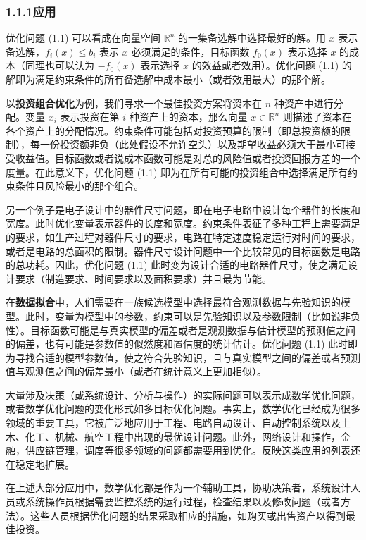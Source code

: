 \documentclass[UTF8, 12pt, fontset=fandol, oneside]{ctexart}
\begin{document}
\subsubsection*{1.1.1\quad 应用}

优化问题 (1.1) 可以看成在向量空间 $\mathbb{R}^n$ 的一集备选解中选择最好的解。用 $x$ 表示备选解，$f_i(x)\le b_i$ 表示 $x$ 必须满足的条件，目标函数 $f_0(x)$ 表示选择 $x$ 的成本（同理也可以认为 $-f_0(x)$ 表示选择 $x$ 的效益或者效用）。优化问题 (1.1) 的解即为满足约束条件的所有备选解中成本最小（或者效用最大）的那个解。

以\textbf{投资组合优化}为例，我们寻求一个最佳投资方案将资本在 $n$ 种资产中进行分配。变量 $x_i$ 表示投资在第 $i$ 种资产上的资本，那么向量 $x\in\mathbb{R}^n$ 则描述了资本在各个资产上的分配情况。约束条件可能包括对投资预算的限制（即总投资额的限制），每一份投资额非负（此处假设不允许空头）以及期望收益必须大于最小可接受收益值。目标函数或者说成本函数可能是对总的风险值或者投资回报方差的一个度量。在此意义下，优化问题 (1.1) 即为在所有可能的投资组合中选择满足所有约束条件且风险最小的那个组合。

另一个例子是电子设计中的器件尺寸问题，即在电子电路中设计每个器件的长度和宽度。此时优化变量表示器件的长度和宽度。约束条件表征了多种工程上需要满足的要求，如生产过程对器件尺寸的要求，电路在特定速度稳定运行对时间的要求，或者是电路的总面积的限制。器件尺寸设计问题中一个比较常见的目标函数是电路的总功耗。因此，优化问题 (1.1) 此时变为设计合适的电路器件尺寸，使之满足设计要求（制造要求、时间要求以及面积要求）并且最为节能。

在\textbf{数据拟合}中，人们需要在一族候选模型中选择最符合观测数据与先验知识的模型。此时，变量为模型中的参数，约束可以是先验知识以及参数限制（比如说非负性）。目标函数可能是与真实模型的偏差或者是观测数据与估计模型的预测值之间的偏差，也有可能是参数值的似然度和置信度的统计估计。优化问题 (1.1) 此时即为寻找合适的模型参数值，使之符合先验知识，且与真实模型之间的偏差或者预测值与观测值之间的偏差最小（或者在统计意义上更加相似）。

大量涉及决策（或系统设计、分析与操作）的实际问题可以表示成数学优化问题，或者数学优化问题的变化形式如多目标优化问题。事实上，数学优化已经成为很多领域的重要工具，它被广泛地应用于工程、电路自动设计、自动控制系统以及土木、化工、机械、航空工程中出现的最优设计问题。此外，网络设计和操作，金融，供应链管理，调度等很多领域的问题都需要用到优化。反映这类应用的列表还在稳定地扩展。

在上述大部分应用中，数学优化都是作为一个辅助工具，协助决策者，系统设计人员或系统操作员根据需要监控系统的运行过程，检查结果以及修改问题（或者方法）。这些人员根据优化问题的结果采取相应的措施，如购买或出售资产以得到最佳投资。
\end{document}
